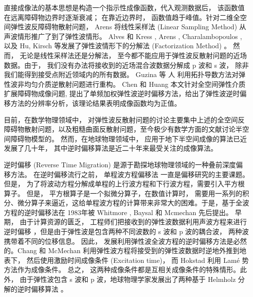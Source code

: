 直接成像法的基本思想是构造一个指示性成像函数，代入观测数据后， 该函数值在远离障碍物边界时逐渐衰减； 在靠近边界时， 函数值趋于峰值。针对二维全空间弹性波反障碍物散射问题， Arens \cite{arens2001linear} 将线性采样法 (Linear Sampling Method) 从声波情形推广了到了弹性波情形。  Alves 和 Kress \cite{alves2002far}, Arens \cite{arens2001linear}, Charalambopoulos \cite{charalambopoulos2006factorization}, 以及  Hu, Kirsch \cite{hu2012some} 等发展了弹性波情形下的分解法 (Factorization Method) 。 然而， 无论是线性采样法还是分解法， 至今都不能应用于弹性波反散射问题的近场数据。由于， 我们没有办法将接收到的近场混合波数据分解成 p 波和 s 波， 除非我们能得到接受点附近领域内的所有数据。 Guzina 等
人 \cite{gintides2012identification} 利用拓扑导数方法对弹性波非均匀介质逆散射问题进行重构。 Chen 和 Huang \cite{ela_reverse} 本文针对全空间弹性介质扩展障碍物成像问题, 提出了单频加权弹性波逆时偏移方法，给出了弹性波逆时偏移方法的分辨率分析，该理论结果表明成像函数均为正值。

目前，在数学物理领域中， 对弹性波反散射问题的讨论主要集中上述的全空间反障碍物散射问题，以及粗糙曲面反散射问题\cite{hu2016factorization,li2016near}，至今极少有数学方面的文献讨论半空间障碍物模型的。 然而，在地球物理领域中， 应用于地下半空间成像的算法已近发展了几十年， 其中逆时偏移算法是近二十年来最受关注的成像算法。

逆时偏移 (Reverse Time Migration) 是源于勘探地球物理领域的一种叠前深度偏移方法。 在逆时偏移流行之前， 单程波方程偏移法\cite{claerbout1972downward,gazdag1978wave} 一直是偏移研究的主要课题。但是， 为了将波动方程分解成单程的上行波方程和下行波方程，需要引入平方根算子\cite{zhanggq1993,Zhang2007}。 但是， 平方根算子是一个拟微分算子，在数值计算时， 需要用一系列的积分、微分算子来逼近，这给单程波方程的计算带来非常大的困难。于是，基于全波方程的逆时偏移法在 1983年被 Whitmore \cite{whitmore1983iterative}, Baysal \cite{baysal1983reverse} 和 Mcmechan  \cite{mcmechan1983migration} 先后提出。 早期， 由于计算资源的匮乏， 工程师们把接收到的弹性波数据利用声波方程来进行逆时偏移 \cite{zhang2009,Zhang08,bleistein2013mathematics,claerbout1985imaging,berkhout2012seismic}，但是由于弹性波是包含两种不同波数的 s 波和 p 波的耦合波， 两种波携带着不同的位移信息\cite{yan2008isotropic}。 因此， 发展利用弹性波全波方程的逆时偏移方法是必然的。Chang 和 McMechan \cite{chang1986reverse} 利用弹性波方程将接受到的弹性波数据时逆地外推到地表下， 然后使用激励时间成像条件 (Excitation time)， 而 Hokstad\cite{hokstad1998elastic} 利用 {Lam\'{e}} 势方法作为成像条件。 总之， 这两种成像条件都是互相关成像条件的特殊情形\cite{yan2008isotropic}。此外， 由于弹性波包含 s 波和 p 波，地球物理学家发展出了两种基于 Helmholz 分解的逆时偏移算法 \cite{yan2008isotropic,sun2001scalar,denli2008elastic,chung2012implementation}。 

